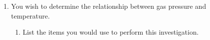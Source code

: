\documentclass{../../../oss-apphys}
\begin{document}
\begin{enumerate}[leftmargin=15pt]
\begin{enumerate}[leftmargin=18pt]
%

\item You wish to determine the relationship between gas pressure and
  temperature.
  \begin{enumerate}[leftmargin=18pt]
  \item List the items you would use to perform this investigation.
    

\end{enumerate}
\end{enumerate}
\end{enumerate}
\end{document}
